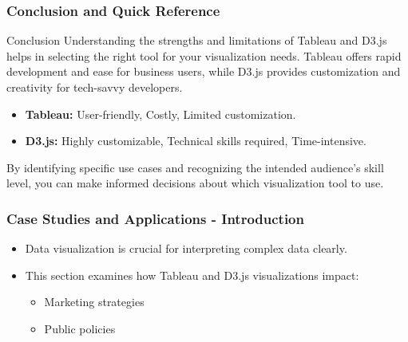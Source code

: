 \documentclass{beamer}
\begin{document}
\begin{frame}[fragile]
    \frametitle{Conclusion and Quick Reference}
    \begin{block}{Conclusion}
        Understanding the strengths and limitations of Tableau and D3.js helps in selecting the right tool for your visualization needs. Tableau offers rapid development and ease for business users, while D3.js provides customization and creativity for tech-savvy developers.
    \end{block}
    
    \begin{itemize}
        \item \textbf{Tableau:} User-friendly, Costly, Limited customization.
        \item \textbf{D3.js:} Highly customizable, Technical skills required, Time-intensive.
    \end{itemize}
    
    By identifying specific use cases and recognizing the intended audience's skill level, you can make informed decisions about which visualization tool to use.
\end{frame}

\begin{frame}[fragile]
    \frametitle{Case Studies and Applications - Introduction}
    \begin{itemize}
        \item Data visualization is crucial for interpreting complex data clearly.
        \item This section examines how Tableau and D3.js visualizations impact:
        \begin{itemize}
            \item Marketing strategies
            \item Public policies
        \end{itemize}
    \end{itemize}
\end{frame}
\end{document}
